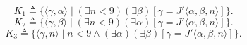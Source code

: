$$K_1 \triangleq \{ \langle \gamma, \alpha \rangle \mid (\exists n < 9)(\exists \beta)[\gamma = J' \langle \alpha, \beta, n \rangle] \}.$$
$$K_2 \triangleq \{ \langle \gamma, \beta \rangle \mid (\exists n < 9)(\exists \alpha)[\gamma = J' \langle \alpha, \beta, n \rangle] \}.$$
$$K_3 \triangleq \{ \langle \gamma, n \rangle \mid n < 9 \land (\exists \alpha)(\exists \beta)[\gamma = J' \langle \alpha, \beta, n \rangle] \}.$$
